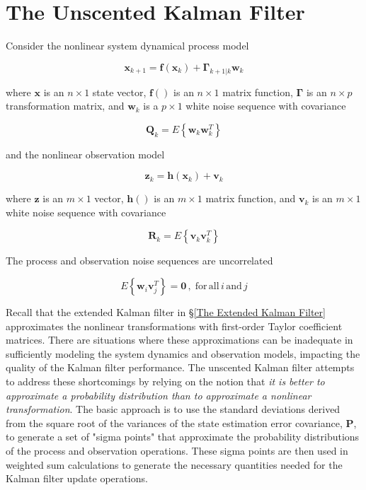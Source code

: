 \section{The Unscented Kalman Filter}
\label{The Unscented Kalman Filter}

Consider the nonlinear system dynamical process model

\begin{equation*}
    \mathbf{x}_{k+1} = \mathbf{f} \left( \mathbf{x}_k \right) + \mathbf{\Gamma}_{k+1|k} \mathbf{w}_k
\end{equation*}

where $\mathbf{x}$ is an $n \times 1$ state vector, $\mathbf{f}()$ is an $n \times 1$
matrix function, $\mathbf{\Gamma}$ is an $n \times p$ transformation matrix, and $\mathbf{w}_k$
is a $p \times 1$ white noise sequence with covariance

\begin{equation*}
    \mathbf{Q}_k = E \left\{ \mathbf{w}_k \mathbf{w}_k^T \right\}
\end{equation*}

and the nonlinear observation model

\begin{equation*}
    \mathbf{z}_k = \mathbf{h} \left( \mathbf{x}_k \right) + \mathbf{v}_k
\end{equation*}

where $\mathbf{z}$ is an $m \times 1$ vector, $\mathbf{h}()$ is an $m \times 1$ matrix
function, and $\mathbf{v}_k$ is an $m \times 1$ white noise sequence with covariance

\begin{equation*}
    \mathbf{R}_k = E \left\{ \mathbf{v}_k \mathbf{v}_k^T \right\}
\end{equation*}

The process and observation noise sequences are uncorrelated

\begin{equation*}
    E \left\{ \mathbf{w}_i \mathbf{v}_j^T \right\} = \mathbf{0} \, , \phantom{.} \mathrm{for} \, \mathrm{all} \, i \, \mathrm{and} \, j
\end{equation*}

Recall that the extended Kalman filter in \S\ref{The Extended Kalman Filter} approximates
the nonlinear transformations with first-order Taylor coefficient matrices. There are
situations where these approximations can be inadequate in sufficiently modeling the
system dynamics and observation models, impacting the quality of the Kalman filter
performance. The unscented Kalman filter attempts to address these shortcomings by
relying on the notion that
\textit{it is better to approximate a probability distribution than to approximate a nonlinear transformation}.
The basic approach is to use the standard deviations derived from the square root of the
variances of the state estimation error covariance, $\mathbf{P}$, to generate a set of
"sigma points" that approximate the probability distributions of the process and
observation operations. These sigma points are then used in weighted sum calculations
to generate the necessary quantities needed for the Kalman filter update operations.

